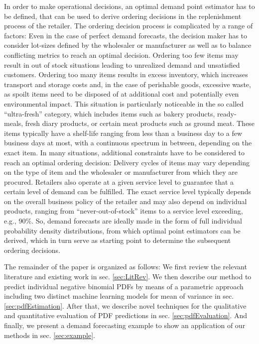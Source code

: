 \documentclass[BCOR=1mm, DIV=calc,10pt,
twoside=true,
twocolumn,
headings=normal]{scrartcl}
\begin{document}
In order to make operational decisions, an optimal demand point estimator has to be defined, that can be used to derive ordering decisions in the replenishment process of the retailer. The ordering decision process is complicated by a range of factors: Even in the case of perfect demand forecasts, the decision maker has to consider lot-sizes defined by the wholesaler or manufacturer as well as to balance conflicting metrics to reach an optimal decision. Ordering too few items may result in out of stock situations leading to unrealized demand and unsatisfied customers. Ordering too many items results in excess inventory, which increases transport and storage costs and, in the case of perishable goods, excessive waste, as spoilt items need to be disposed of at additional cost and potentially even environmental impact. This situation is particularly noticeable in the so called ``ultra-fresh'' category, which includes items such as bakery products, ready-meals, fresh diary products, or certain meat products such as ground meat. These items typically have a shelf-life ranging from less than a business day to a few business days at most, with a continuous spectrum in between, depending on the exact item. In many situations, additional constraints have to be considered to reach an optimal ordering decision: Delivery cycles of items may vary depending on the type of item and the wholesaler or manufacturer from which they are procured. Retailers also operate at a given service level to guarantee that a certain level of demand can be fulfilled. The exact service level typically depends on the overall business policy of the retailer and may also depend on individual products, ranging from ``never-out-of-stock'' items to a service level exceeding, e.g., 90\%. So, demand forecasts are ideally made in the form of full individual probability density distributions, from which optimal point estimators can be derived, which in turn serve as starting point to determine the subsequent ordering decisions.

The remainder of the paper is organized as follows: We first review the relevant literature and existing work in sec. \ref{sec:LitRev}. We then describe our method to predict individual negative binomial PDFs by means of a parametric approach including two distinct machine learning models for mean of variance in sec. \ref{sec:pdfEstimation}. After that, we describe novel techniques for the qualitative and quantitative evaluation of PDF predictions in sec. \ref{sec:pdfEvaluation}. And finally, we present a demand forecasting example to show an application of our methods in sec. \ref{sec:example}.
\end{document}
